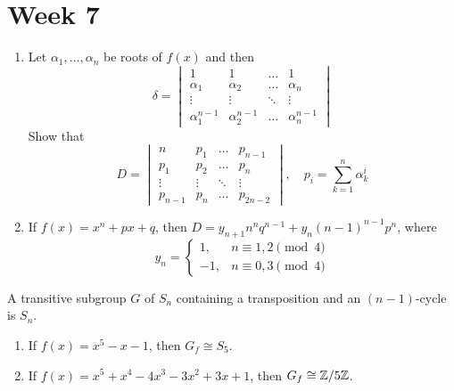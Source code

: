 
\section{Week 7}

\begin{exercise} \mbox{}
  \begin{enumerate}
    \item Let $\alpha_1, \dots, \alpha_n$ be roots of $f(x)$ and then
      \[
        \delta = \begin{vmatrix}
          1 & 1 & \dots & 1 \\
          \alpha_1 & \alpha_2 & \dots & \alpha_n \\
          \vdots & \vdots & \ddots & \vdots \\
          \alpha_1^{n-1} & \alpha_2^{n-1} & \dots & \alpha_n^{n-1}
        \end{vmatrix}
      \]
      Show that 
      \[
        D =  \begin{vmatrix}
          n & p_1 & \dots & p_{n-1} \\
          p_1 & p_2 & \dots & p_n \\
          \vdots & \vdots & \ddots & \vdots \\
          p_{n-1} & p_n & \dots & p_{2n-2}
        \end{vmatrix},
        \quad p_i = \sum_{k=1}^n \alpha_k^i
      \]
    \item If $f(x) = x^n + px + q$, then $D = y_{n+1}n^n q^{n-1} +
      y_n(n-1)^{n-1} p^n$, where
      \[
        y_n = \begin{cases}
          1, & n \equiv 1, 2 \pmod 4 \\
          -1, & n \equiv 0, 3 \pmod 4
        \end{cases}
      \]
  \end{enumerate}
\end{exercise}

\begin{exercise}
  A transitive subgroup $G$ of $S_n$ containing a transposition and an
  $(n-1)$-cycle is $S_n$.
\end{exercise}

\begin{exercise} \mbox{}
  \begin{enumerate}
    \item If $f(x) = x^5 - x - 1$, then $G_f \cong S_5$.
    \item If $f(x) = x^5 + x^4 - 4x^3 - 3x^2 + 3x + 1$, then
      $G_f \cong {\mathbb{Z}}/{5\mathbb{Z}}$.
  \end{enumerate}
\end{exercise}
